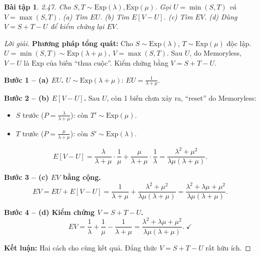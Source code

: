 \documentclass[8pt,a4paper]{article}
\newtheorem{exercise}{Bài tập}
\newenvironment{solution}{\begin{proof}[Lời giải]}{\end{proof}}
\begin{document}
\begin{exercise}
2.47. Cho $S, T \sim \text{Exp}(\lambda), \text{Exp}(\mu)$. Gọi $U = \min(S, T)$ và $V = \max(S, T)$. 
(a) Tìm $EU$. (b) Tìm $E[V-U]$. (c) Tìm $EV$. (d) Dùng $V = S+T-U$ để kiểm chứng lại $EV$.
\end{exercise}
\begin{solution}
\textbf{Phương pháp tổng quát:} Cho $S \sim \text{Exp}(\lambda)$, $T \sim \text{Exp}(\mu)$ độc lập. $U = \min(S,T) \sim \text{Exp}(\lambda+\mu)$, $V = \max(S,T)$. Sau $U$, do Memoryless, $V-U$ là $\text{Exp}$ của biến ``thua cuộc''. Kiểm chứng bằng $V = S+T-U$.

\textbf{Bước 1 -- (a) $EU$.} $U \sim \text{Exp}(\lambda+\mu)$: $\boxed{EU = \frac{1}{\lambda+\mu}}$.

\textbf{Bước 2 -- (b) $E[V-U]$.} Sau $U$, còn 1 biến chưa xảy ra, ``reset'' do Memoryless:
\begin{itemize}[nosep]
  \item $S$ trước ($P = \frac{\lambda}{\lambda+\mu}$): còn $T' \sim \text{Exp}(\mu)$.
  \item $T$ trước ($P = \frac{\mu}{\lambda+\mu}$): còn $S' \sim \text{Exp}(\lambda)$.
\end{itemize}
\[ E[V-U] = \frac{\lambda}{\lambda+\mu} \cdot \frac{1}{\mu} + \frac{\mu}{\lambda+\mu} \cdot \frac{1}{\lambda} = \boxed{\frac{\lambda^2 + \mu^2}{\lambda\mu(\lambda+\mu)}}. \]

\textbf{Bước 3 -- (c) $EV$ bằng cộng.}
\[ EV = EU + E[V-U] = \frac{1}{\lambda+\mu} + \frac{\lambda^2+\mu^2}{\lambda\mu(\lambda+\mu)} = \boxed{\frac{\lambda^2+\lambda\mu+\mu^2}{\lambda\mu(\lambda+\mu)}}. \]

\textbf{Bước 4 -- (d) Kiểm chứng $V = S+T-U$.}
\[ EV = \frac{1}{\lambda} + \frac{1}{\mu} - \frac{1}{\lambda+\mu} = \frac{\lambda^2+\lambda\mu+\mu^2}{\lambda\mu(\lambda+\mu)}. \;\checkmark \]

\textbf{Kết luận:} Hai cách cho cùng kết quả. Đẳng thức $V = S+T-U$ rất hữu ích.
\end{solution}
\end{document}
